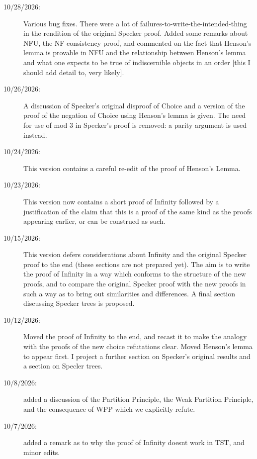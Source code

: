 \documentclass[12pt]{article}
\begin{document}
\begin{description}

\item[10/28/2026:]  Various bug fixes.  There were a lot of failures-to-write-the-intended-thing in the rendition of the original Specker proof.  Added some remarks about NFU, the NF consistency proof, and commented on the fact that Henson's lemma is provable in NFU and the relationship between Henson's lemma and what one expects to be true of indiscernible objects in an order [this I should add detail to, very likely].

\item[10/26/2026:]  A discussion of Specker's original disproof of Choice and a version of the proof of the negation of Choice using Henson's lemma is given.  The need for use of mod 3 in Specker's proof is removed:  a parity argument is used instead.

\item[10/24/2026:]  This version contains a careful re-edit of the proof of Henson's Lemma.

\item[10/23/2026:]  This version now contains a short proof of Infinity followed by a justification of the claim that this is a proof of the same kind as the proofs appearing earlier, or can be construed as such.

\item[10/15/2026:]  This version defers considerations about Infinity and the original Specker proof to the end (these sections are not prepared yet).  The aim is to write the proof of Infinity in a way which conforms to
the structure of the new proofs, and to compare the original Specker proof with the new proofs in such a way as to bring out similarities and differences.  A final section discussing Specker trees is proposed.

\item[10/12/2026:]  Moved the proof of Infinity to the end, and recast it to make the analogy with the proofs of the new choice refutations clear.  Moved Henson's lemma to appear first.  I project a further section on Specker's original results and a section on Specler trees.

\item[10/8/2026:]  added a discussion of the Partition Principle, the Weak Partition Principle, and the consequence of WPP which we explicitly refute.

\item[10/7/2026:]  added a remark as to why the proof of Infinity doesnt work in TST, and minor edits.


\end{description}
\end{document}
